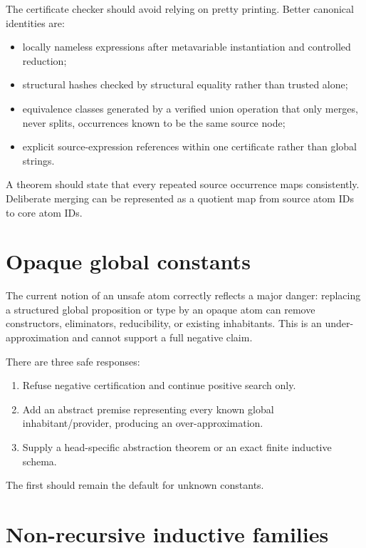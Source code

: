 \documentclass[11pt,letterpaper,openany]{report}
\theoremstyle{definition}
\theoremstyle{remark}
\begin{document}
The certificate checker should avoid relying on pretty printing. Better canonical identities are:

\begin{itemize}
\item locally nameless expressions after metavariable instantiation and controlled reduction;
\item structural hashes checked by structural equality rather than trusted alone;
\item equivalence classes generated by a verified union operation that only merges, never splits, occurrences known to be the same source node;
\item explicit source-expression references within one certificate rather than global strings.
\end{itemize}

A theorem should state that every repeated source occurrence maps consistently. Deliberate merging can be represented as a quotient map from source atom IDs to core atom IDs.

\section{Opaque global constants}

The current notion of an unsafe atom correctly reflects a major danger: replacing a structured global proposition or type by an opaque atom can remove constructors, eliminators, reducibility, or existing inhabitants. This is an under-approximation and cannot support a full negative claim.

There are three safe responses:

\begin{enumerate}
\item Refuse negative certification and continue positive search only.
\item Add an abstract premise representing every known global inhabitant/provider, producing an over-approximation.
\item Supply a head-specific abstraction theorem or an exact finite inductive schema.
\end{enumerate}

The first should remain the default for unknown constants.

\section{Non-recursive inductive families}
\label{sec:finite-inductives}
\end{document}
